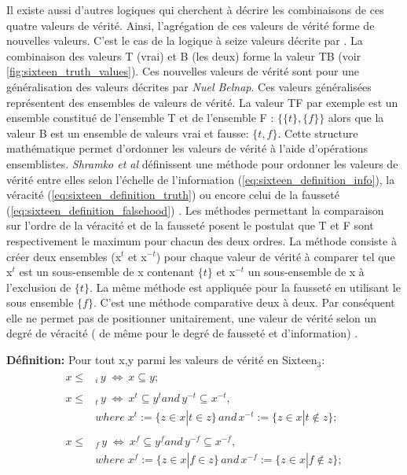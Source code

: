 \begin{refsegment}
    Il existe aussi d’autres logiques qui cherchent à décrire les combinaisons de ces quatre valeurs de vérité. Ainsi, l’agrégation de ces valeurs de vérité forme de nouvelles valeurs. C’est le cas de la logique à seize valeurs décrite par \citeauthor{shramko2005some} \cite{shramko2005some,shramko2011truth,shramko2006hyper}. La combinaison des valeurs T (vrai) et B (les deux) forme la valeur TB (voir \cref{fig:sixteen_truth_values}). Ces nouvelles valeurs de vérité sont pour \citeauthor{shramko2005some} une généralisation des valeurs décrites par \textit{Nuel Belnap}. Ces valeurs généralisées représentent des ensembles de valeurs de vérité. La valeur TF par exemple est un ensemble constitué de l'ensemble T et de l'ensemble F : $\{\{t\},\{f\}\}$ alors que la valeur B est un ensemble de valeurs vrai et fausse: $\{t,f\}$. Cette structure mathématique permet d'ordonner les valeurs de vérité à l'aide d'opérations ensemblistes. \textit{Shramko et al} définissent une méthode pour ordonner les valeurs de vérité entre elles selon l'échelle de l'information (\ref{eq:sixteen_definition_info}), la véracité (\ref{eq:sixteen_definition_truth}) ou encore celui de la fausseté (\ref{eq:sixteen_definition_falsehood}) . Les méthodes permettant la comparaison sur l'ordre de la véracité et de la fausseté posent le postulat que T et F sont respectivement le maximum pour chacun des deux ordres. La méthode consiste à créer deux ensembles (x$^{t}$ et x$^{-t}$) pour chaque valeur de vérité à comparer tel que x$^{t}$ est un sous-ensemble de x contenant $\{t\}$ et x$^{-t}$ un sous-ensemble de x à l'exclusion de $\{t\}$. La même méthode est appliquée pour la fausseté en utilisant le sous ensemble $\{f\}$.  C'est une méthode comparative deux à deux. Par conséquent elle ne permet pas de positionner unitairement, une valeur de vérité selon un degré de véracité ( de même pour le degré de fausseté et d'information) .
    
    \textbf{Définition:} Pour tout x,y parmi les valeurs de vérité en Sixteen$_{3}$:\nolisttopbreak \vspace{-0.5cm}
    \begin{align}
        \begin{split}
        x \leq& _{i} \, y \; \iff \: x \subseteq y\label{eq:sixteen_definition_info};
        \end{split}\\ \begin{split}\label{eq:sixteen_definition_truth}
        x \leq& _{t} \, y \; \iff \: x^{t} \subseteq y^{t} and \, y^{-t} \subseteq x^{-t},\\
              &where \; x^{t} := \{z \in x | t \in z \} \, and \, x^{-t} := \{z \in x | t \notin z \};
        \end{split}\\ \begin{split}\label{eq:sixteen_definition_falsehood}
        x \leq& _{f} \, y \; \iff \: x^{f} \subseteq y^{f} and \, y^{-f} \subseteq x^{-f},\\
              &where \; x^{f} := \{z \in x | f \in z \} \, and \, x^{-f} := \{z \in x | f \notin z \};
        \end{split}
    \end{align}
    

\end{refsegment}
